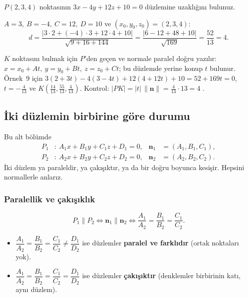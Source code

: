 \begin{soru}
$P(2,3,4)$ noktasının $3x-4y+12z+10=0$ düzlemine uzaklığını bulunuz.
\end{soru}
\begin{cevap}
$A=3,\ B=-4,\ C=12,\ D=10$ ve $(x_0,y_0,z_0)=(2,3,4)$:
\[ d=\frac{|3\cdot2+(-4)\cdot3+12\cdot4+10|}{\sqrt{9+16+144}}=\frac{|6-12+48+10|}{\sqrt{169}}=\frac{52}{13}=\boxed{4}. \]
\end{cevap}

\begin{bilgi}
$K$ noktasını bulmak için $P$'den geçen ve normale paralel doğru yazılır: $x=x_0+At,\ y=y_0+Bt,\ z=z_0+Ct$; bu düzlemde yerine konup $t$ bulunur. Örnek~9 için $3(2+3t)-4(3-4t)+12(4+12t)+10=52+169t=0$, $t=-\frac{4}{13}$ ve $K\left(\frac{14}{13},\frac{55}{13},\frac{4}{13}\right)$. Kontrol: $|PK|=|t|\,\|\mathbf n\|=\frac{4}{13}\cdot13=4$ \checkmark.
\end{bilgi}

\subsection{İki düzlemin birbirine göre durumu}

Bu alt bölümde
\begin{align*}
P_1&:\ A_1x+B_1y+C_1z+D_1=0, & \mathbf n_1&=(A_1,B_1,C_1),\\
P_2&:\ A_2x+B_2y+C_2z+D_2=0, & \mathbf n_2&=(A_2,B_2,C_2).
\end{align*}
İki düzlem ya paraleldir, ya çakışıktır, ya da bir doğru boyunca kesişir. Hepsini normallerle anlarız.

\subsubsection{Paralellik ve çakışıklık}

\begin{teorem}
\[ P_1\parallel P_2\iff\mathbf n_1\parallel\mathbf n_2\iff \frac{A_1}{A_2}=\frac{B_1}{B_2}=\frac{C_1}{C_2}. \]
\begin{itemize}
  \item $\dfrac{A_1}{A_2}=\dfrac{B_1}{B_2}=\dfrac{C_1}{C_2}\neq\dfrac{D_1}{D_2}$ ise düzlemler \textbf{paralel ve farklıdır} (ortak noktaları yok).
  \item $\dfrac{A_1}{A_2}=\dfrac{B_1}{B_2}=\dfrac{C_1}{C_2}=\dfrac{D_1}{D_2}$ ise düzlemler \textbf{çakışıktır} (denklemler birbirinin katı, aynı düzlem).
\end{itemize}
\end{teorem}

